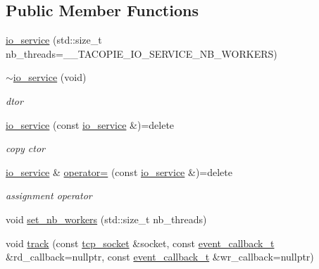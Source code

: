 \subsection*{Public Member Functions}
\begin{DoxyCompactItemize}
\item 
\hyperlink{classtacopie_1_1io__service_a62edde9b62571610413d99d075df8102}{io\+\_\+service} (std\+::size\+\_\+t nb\+\_\+threads=\+\_\+\+\_\+\+T\+A\+C\+O\+P\+I\+E\+\_\+\+I\+O\+\_\+\+S\+E\+R\+V\+I\+C\+E\+\_\+\+N\+B\+\_\+\+W\+O\+R\+K\+E\+RS)
\item 
\mbox{\label{classtacopie_1_1io__service_ae423d7e4b13f07fe41fb051345ffbf8d}} 
\hyperlink{classtacopie_1_1io__service_ae423d7e4b13f07fe41fb051345ffbf8d}{$\sim$io\+\_\+service} (void)
\begin{DoxyCompactList}\small\item\em dtor \end{DoxyCompactList}\item 
\mbox{\label{classtacopie_1_1io__service_ad5da7503d8fec083c6d28455ec9e21c7}} 
\hyperlink{classtacopie_1_1io__service_ad5da7503d8fec083c6d28455ec9e21c7}{io\+\_\+service} (const \hyperlink{classtacopie_1_1io__service}{io\+\_\+service} \&)=delete
\begin{DoxyCompactList}\small\item\em copy ctor \end{DoxyCompactList}\item 
\mbox{\label{classtacopie_1_1io__service_a980652008516b38357d405c16eda07fa}} 
\hyperlink{classtacopie_1_1io__service}{io\+\_\+service} \& \hyperlink{classtacopie_1_1io__service_a980652008516b38357d405c16eda07fa}{operator=} (const \hyperlink{classtacopie_1_1io__service}{io\+\_\+service} \&)=delete
\begin{DoxyCompactList}\small\item\em assignment operator \end{DoxyCompactList}\item 
void \hyperlink{classtacopie_1_1io__service_a7e2b0700c0a4591f86c344df8748b3a5}{set\+\_\+nb\+\_\+workers} (std\+::size\+\_\+t nb\+\_\+threads)
\item 
void \hyperlink{classtacopie_1_1io__service_a9f4c8bce3c0f6d660515b0b5eb109df8}{track} (const \hyperlink{classtacopie_1_1tcp__socket}{tcp\+\_\+socket} \&socket, const \hyperlink{classtacopie_1_1io__service_abb66850c32d9c724f4418d77bd04bcfd}{event\+\_\+callback\+\_\+t} \&rd\+\_\+callback=nullptr, const \hyperlink{classtacopie_1_1io__service_abb66850c32d9c724f4418d77bd04bcfd}{event\+\_\+callback\+\_\+t} \&wr\+\_\+callback=nullptr)

\end{DoxyCompactItemize}
